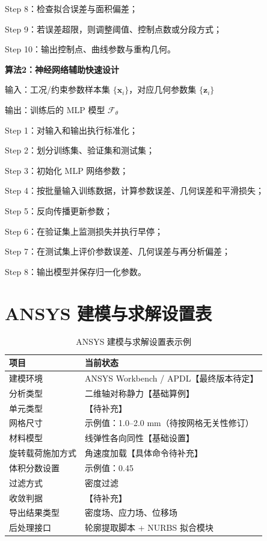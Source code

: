 \documentclass{FRB-style}
\begin{document}
Step 8：检查拟合误差与面积偏差；

Step 9：若误差超限，则调整阈值、控制点数或分段方式；

Step 10：输出控制点、曲线参数与重构几何。

\vspace{1em}
\noindent\textbf{算法2：神经网络辅助快速设计}

输入：工况/约束参数样本集 $\{\mathbf{x}_i\}$，对应几何参数集 $\{\mathbf{z}_i\}$

输出：训练后的 MLP 模型 $\mathcal{F}_{\theta}$

Step 1：对输入和输出执行标准化；

Step 2：划分训练集、验证集和测试集；

Step 3：初始化 MLP 网络参数；

Step 4：按批量输入训练数据，计算参数误差、几何误差和平滑损失；

Step 5：反向传播更新参数；

Step 6：在验证集上监测损失并执行早停；

Step 7：在测试集上评价参数误差、几何误差与再分析偏差；

Step 8：输出模型并保存归一化参数。

\section{ANSYS 建模与求解设置表}

\begin{table}[H]
\centering
\caption{ANSYS 建模与求解设置表示例}
\begin{tabular}{ll}
\toprule
项目 & 当前状态 \\
\midrule
建模环境 & ANSYS Workbench / APDL【最终版本待定】 \\
分析类型 & 二维轴对称静力【基础算例】 \\
单元类型 & 【待补充】 \\
网格尺寸 & 示例值：1.0--2.0 mm（待按网格无关性修订） \\
材料模型 & 线弹性各向同性【基础设置】 \\
旋转载荷施加方式 & 角速度加载【具体命令待补充】 \\
体积分数设置 & 示例值：0.45 \\
过滤方式 & 密度过滤 \\
收敛判据 & 【待补充】 \\
导出结果类型 & 密度场、应力场、位移场 \\
后处理接口 & 轮廓提取脚本 + NURBS 拟合模块 \\
\bottomrule
\end{tabular}
\end{table}
\end{document}
